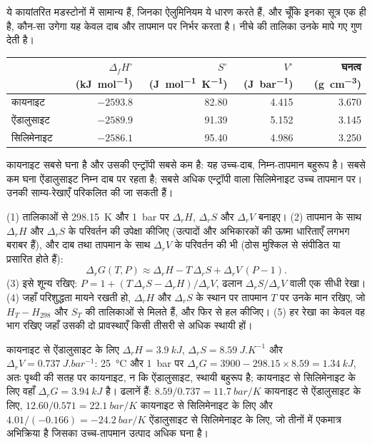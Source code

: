 ये कायांतरित मडस्टोनों में सामान्य हैं, जिनका ऐलुमिनियम ये धारण करते हैं, और चूँकि इनका
सूत्र एक ही है, कौन-सा उगेगा यह केवल दाब और तापमान पर निर्भर करता है। नीचे की
तालिका उनके मापे गए गुण देती है।

\begin{center}
\small
\begin{tabular}{@{}lrrrr@{}}
\hline
 & $\Delta_f H^\circ$ (\unit{kJ.mol^{-1}}) & $S^\circ$ (\unit{J.mol^{-1}.K^{-1}}) & $V^\circ$ (\unit{J.bar^{-1}}) & घनत्व (\unit{g.cm^{-3}})\\
\hline
कायनाइट & $-2593.8$ & 82.80 & 4.415 & 3.670\\
ऐंडालुसाइट & $-2589.9$ & 91.39 & 5.152 & 3.145\\
सिलिमेनाइट & $-2586.1$ & 95.40 & 4.986 & 3.250\\
\hline
\end{tabular}
\par{}
\end{center}

कायनाइट सबसे घना है और उसकी एन्ट्रॉपी सबसे कम है: यह उच्च-दाब,
निम्न-तापमान बहुरूप है। सबसे कम घना ऐंडालुसाइट निम्न दाब पर रहता है; सबसे अधिक एन्ट्रॉपी वाला
सिलिमेनाइट उच्च तापमान पर। उनकी साम्य-रेखाएँ परिकलित की जा सकती हैं।

\begin{method}[अभिक्रिया-रेखा का परिकलन]\label{met:b2:metamorphic-facies:line}
(1) तालिकाओं से \qty{298.15}{K}
और \qty{1}{bar} पर $\Delta_r H$, $\Delta_r S$ और $\Delta_r V$ बनाइए। (2) तापमान के साथ $\Delta_r H$ और $\Delta_r S$ के
परिवर्तन की उपेक्षा कीजिए (उत्पादों और अभिकारकों की ऊष्मा धारिताएँ लगभग बराबर हैं), और दाब तथा तापमान के साथ $\Delta_r V$ के
परिवर्तन की भी (ठोस मुश्किल से संपीडित या प्रसारित होते हैं):
\[
\Delta_r G(T, P) \approx \Delta_r H - T\,\Delta_r S + \Delta_r V\,(P - 1).
\]
(3) इसे शून्य रखिए: $P = 1 + (T\,\Delta_r S - \Delta_r H)/\Delta_r V$, ढलान
$\Delta_r S/\Delta_r V$ वाली एक सीधी रेखा। (4) जहाँ परिशुद्धता मायने रखती हो, $\Delta_r H$ और
$\Delta_r S$ के स्थान पर तापमान $T$ पर उनके मान रखिए, जो $H_T - H_{298}$ और $S_T$ की तालिकाओं से मिलते हैं,
और फिर से हल कीजिए। (5) हर रेखा का केवल वह भाग रखिए जहाँ उसकी दो प्रावस्थाएँ किसी तीसरी से
अधिक स्थायी हों।
\end{method}

कायनाइट से ऐंडालुसाइट के लिए $\Delta_r H = \qty{3.9}{kJ}$, $\Delta_r S =
\qty{8.59}{J.K^{-1}}$ और $\Delta_r V = \qty{0.737}{J.bar^{-1}}$: \qty{25}{\celsius}
और \qty{1}{bar} पर $\Delta_r G = 3900 - 298.15\times8.59 = \qty{+1.34}{kJ}$, अतः पृथ्वी की सतह पर कायनाइट,
न कि ऐंडालुसाइट, स्थायी बहुरूप है; कायनाइट से सिलिमेनाइट के लिए वहाँ
$\Delta_r G = \qty{+3.94}{kJ}$ है। ढलानें हैं: $8.59/0.737 = \qty{11.7}{bar/K}$
कायनाइट से ऐंडालुसाइट के लिए, $12.60/0.571 = \qty{22.1}{bar/K}$ कायनाइट से सिलिमेनाइट के लिए और
$4.01/(-0.166) = \qty{-24.2}{bar/K}$ ऐंडालुसाइट से सिलिमेनाइट के लिए, जो तीनों में
एकमात्र अभिक्रिया है जिसका उच्च-तापमान उत्पाद अधिक घना है।

